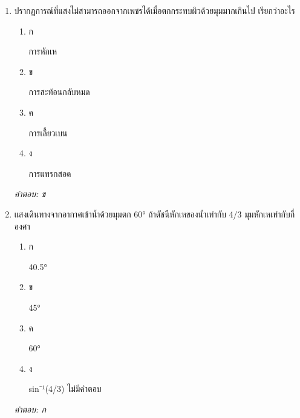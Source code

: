 \documentclass[12pt]{article}
\begin{document}
\begin{enumerate}[label=\arabic*., itemsep=0.5\baselineskip, topsep=0.5\baselineskip, leftmargin=*]
\item ปรากฏการณ์ที่แสงไม่สามารถออกจากเพชรได้เมื่อตกกระทบผิวด้วยมุมมากเกินไป เรียกว่าอะไร
\begin{enumerate}[label=\alph*)., itemsep=0.3\baselineskip, topsep=0.3\baselineskip]
\item ก\ 
\begin{minipage}[t]{0.9\linewidth}
\raggedright การหักเห
\end{minipage}
\item ข\ 
\begin{minipage}[t]{0.9\linewidth}
\raggedright การสะท้อนกลับหมด
\end{minipage}
\item ค\ 
\begin{minipage}[t]{0.9\linewidth}
\raggedright การเลี้ยวเบน
\end{minipage}
\item ง\ 
\begin{minipage}[t]{0.9\linewidth}
\raggedright การแทรกสอด
\end{minipage}
\end{enumerate}
\vspace{-0.3\baselineskip}
\begin{small}
\textit{คำตอบ: ข}
\end{small}

\item แสงเดินทางจากอากาศเข้าน้ำด้วยมุมตก 60° ถ้าดัชนีหักเหของน้ำเท่ากับ 4/3 มุมหักเหเท่ากับกี่องศา
\begin{enumerate}[label=\alph*)., itemsep=0.3\baselineskip, topsep=0.3\baselineskip]
\item ก\ 
\begin{minipage}[t]{0.9\linewidth}
\raggedright 40.5°
\end{minipage}
\item ข\ 
\begin{minipage}[t]{0.9\linewidth}
\raggedright 45°
\end{minipage}
\item ค\ 
\begin{minipage}[t]{0.9\linewidth}
\raggedright 60°
\end{minipage}
\item ง\ 
\begin{minipage}[t]{0.9\linewidth}
\raggedright sin⁻¹(4/3) ไม่มีคำตอบ
\end{minipage}
\end{enumerate}
\vspace{-0.3\baselineskip}
\begin{small}
\textit{คำตอบ: ก}
\end{small}


\end{enumerate}
\end{document}
